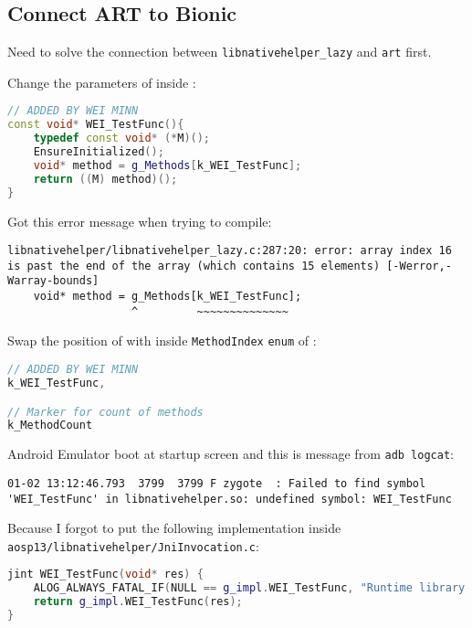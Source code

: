 \subsection{Connect ART to Bionic}
\label{task:20230102_aosp}

Need to solve the connection between \texttt{libnativehelper\_lazy} and \texttt{art} first.

Change the parameters of  inside :
\begin{lstlisting}[language=C++]
// ADDED BY WEI MINN
const void* WEI_TestFunc(){
    typedef const void* (*M)();
    EnsureInitialized();                            
    void* method = g_Methods[k_WEI_TestFunc];           
    return ((M) method)();            
}
\end{lstlisting}

Got this error message when trying to compile:
\begin{lstlisting}
libnativehelper/libnativehelper_lazy.c:287:20: error: array index 16 is past the end of the array (which contains 15 elements) [-Werror,-Warray-bounds]
    void* method = g_Methods[k_WEI_TestFunc];           
                   ^         ~~~~~~~~~~~~~~
\end{lstlisting}

Swap the position of  with  inside \texttt{MethodIndex} \texttt{enum} of :
\begin{lstlisting}[language=C++]
// ADDED BY WEI MINN
k_WEI_TestFunc,

// Marker for count of methods
k_MethodCount   
\end{lstlisting}

Android Emulator boot at startup screen and this is message from \texttt{adb logcat}:
\begin{lstlisting}
01-02 13:12:46.793  3799  3799 F zygote  : Failed to find symbol 'WEI_TestFunc' in libnativehelper.so: undefined symbol: WEI_TestFunc
\end{lstlisting}
Because I forgot to put the following implementation inside \texttt{aosp13/libnativehelper/JniInvocation.c}:
\begin{lstlisting}[language=C++]
jint WEI_TestFunc(void* res) {
    ALOG_ALWAYS_FATAL_IF(NULL == g_impl.WEI_TestFunc, "Runtime library not loaded.");
    return g_impl.WEI_TestFunc(res);
}  
\end{lstlisting}

